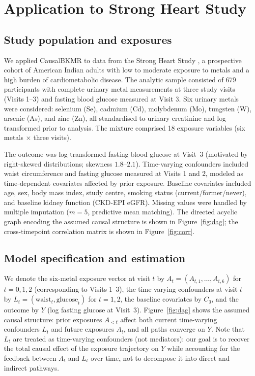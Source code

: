 
\section*{Application to Strong Heart Study}

\subsection*{Study population and exposures}

We applied CausalBKMR to data from the Strong Heart Study \citep[SHS;][]{shs_lee_1990}, a prospective cohort of American Indian adults with low to moderate exposure to metals and a high burden of cardiometabolic disease. The analytic sample consisted of 679 participants with complete urinary metal measurements at three study visits (Visits 1--3) and fasting blood glucose measured at Visit 3. Six urinary metals were considered: selenium (Se), cadmium (Cd), molybdenum (Mo), tungsten (W), arsenic (As), and zinc (Zn), all standardised to urinary creatinine and log-transformed prior to analysis. The mixture comprised 18 exposure variables (six metals $\times$ three visits).

The outcome was log-transformed fasting blood glucose at Visit~3 (motivated by right-skewed distributions; skewness $1.8$--$2.1$). Time-varying confounders included waist circumference and fasting glucose measured at Visits 1 and 2, modeled as time-dependent covariates affected by prior exposure. Baseline covariates included age, sex, body mass index, study centre, smoking status (current/former/never), and baseline kidney function (CKD-EPI eGFR). Missing values were handled by multiple imputation ($m = 5$, predictive mean matching). The directed acyclic graph encoding the assumed causal structure is shown in Figure~\ref{fig:dag}; the cross-timepoint correlation matrix is shown in Figure~\ref{fig:corr}.

\subsection*{Model specification and estimation}

We denote the six-metal exposure vector at visit $t$ by $A_t = (A_{t,1}, \ldots, A_{t,6})$ for $t = 0, 1, 2$ (corresponding to Visits 1--3), the time-varying confounders at visit $t$ by $L_t = (\text{waist}_t, \text{glucose}_t)$ for $t = 1, 2$, the baseline covariates by $C_0$, and the outcome by $Y$ (log fasting glucose at Visit~3). Figure~\ref{fig:dag} shows the assumed causal structure: prior exposures $A_{<t}$ affect both current time-varying confounders $L_t$ and future exposures $A_t$, and all paths converge on $Y$. Note that $L_t$ are treated as time-varying confounders (not mediators): our goal is to recover the total causal effect of the exposure trajectory on $Y$ while accounting for the feedback between $A_t$ and $L_t$ over time, not to decompose it into direct and indirect pathways.

